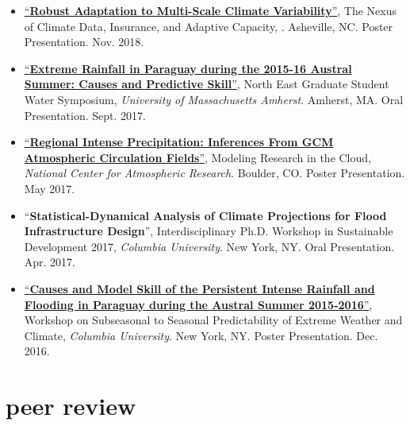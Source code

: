 \documentclass[10pt,oneside]{article}
\begin{document}
\begin{itemize}[label={}]
  \item \href{https://doi.org/10.6084/m9.figshare.8277002.v1}{\enquote{\textbf{Robust Adaptation to Multi-Scale Climate Variability}}}, The Nexus of Climate Data, Insurance, and Adaptive Capacity,  \textit{}. Asheville, NC. Poster Presentation. Nov. 2018.
        
  \item \href{https://doi.org/10.6084/m9.figshare.8277128.v2}{\enquote{\textbf{Extreme Rainfall in Paraguay during the 2015-16 Austral Summer: Causes and Predictive Skill}}}, North East Graduate Student Water Symposium,  \textit{University of Massachusetts Amherst}. Amherst, MA. Oral Presentation. Sept. 2017.
        
  \item \href{https://doi.org/10.6084/m9.figshare.8277167.v1}{\enquote{\textbf{Regional Intense Precipitation: Inferences From GCM Atmospheric Circulation Fields}}}, Modeling Research in the Cloud,  \textit{National Center for Atmospheric Research}. Boulder, CO. Poster Presentation. May 2017.
        
  \item \enquote{\textbf{Statistical-Dynamical Analysis of Climate Projections for Flood Infrastructure Design}}, Interdisciplinary Ph.D. Workshop in Sustainable Development 2017,  \textit{Columbia University}. New York, NY. Oral Presentation. Apr. 2017.
        
  \item \href{https://doi.org/10.13140/RG.2.2.20146.30406}{\enquote{\textbf{Causes and Model Skill of the Persistent Intense Rainfall and Flooding in Paraguay during the Austral Summer 2015-2016}}}, Workshop on Subseasonal to Seasonal Predictability of Extreme Weather and Climate,  \textit{Columbia University}. New York, NY. Poster Presentation. Dec. 2016.
        
\end{itemize}


\section{peer review}

\mbox{}\vspace{-\dimexpr\baselineskip\relax}
\end{document}
